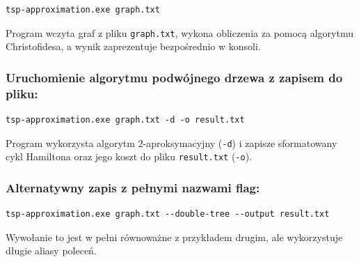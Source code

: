\documentclass{article}
\theoremstyle{definition}
\theoremstyle{plain}
\theoremstyle{remark}
\begin{document}
\begin{verbatim}
tsp-approximation.exe graph.txt
\end{verbatim}

Program wczyta graf z pliku \texttt{graph.txt}, wykona obliczenia za pomocą algorytmu Christofidesa, a wynik zaprezentuje bezpośrednio w konsoli.

\subsubsection*{Uruchomienie algorytmu podwójnego drzewa z zapisem do pliku:}
\begin{verbatim}
tsp-approximation.exe graph.txt -d -o result.txt
\end{verbatim}
Program wykorzysta algorytm 2-aproksymacyjny (\texttt{-d}) i zapisze sformatowany cykl Hamiltona oraz jego koszt do pliku \texttt{result.txt} (\texttt{-o}).

\subsubsection*{Alternatywny zapis z pełnymi nazwami flag:}
\begin{verbatim}
tsp-approximation.exe graph.txt --double-tree --output result.txt
\end{verbatim}
Wywołanie to jest w pełni równoważne z przykładem drugim, ale wykorzystuje długie aliasy poleceń.

\newpage
\printbibliography

\end{document}
